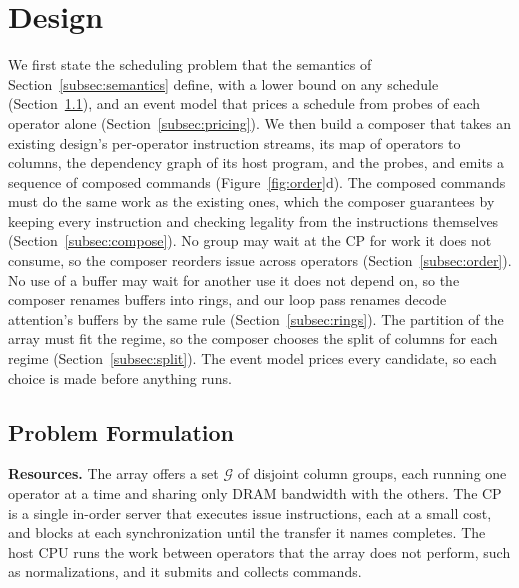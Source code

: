 \section{Design}
\label{sec:method}

We first state the scheduling problem that the semantics of Section~\ref{subsec:semantics} define, with a lower bound on any schedule (Section~\ref{subsec:formulation}), and an event model that prices a schedule from probes of each operator alone (Section~\ref{subsec:pricing}).
We then build a composer that takes an existing design's per-operator instruction streams, its map of operators to columns, the dependency graph of its host program, and the probes, and emits a sequence of composed commands (Figure~\ref{fig:order}d).
The composed commands must do the same work as the existing ones, which the composer guarantees by keeping every instruction and checking legality from the instructions themselves (Section~\ref{subsec:compose}).
No group may wait at the CP for work it does not consume, so the composer reorders issue across operators (Section~\ref{subsec:order}).
No use of a buffer may wait for another use it does not depend on, so the composer renames buffers into rings, and our loop pass renames decode attention's buffers by the same rule (Section~\ref{subsec:rings}).
The partition of the array must fit the regime, so the composer chooses the split of columns for each regime (Section~\ref{subsec:split}).
The event model prices every candidate, so each choice is made before anything runs.

\subsection{Problem Formulation}
\label{subsec:formulation}

\textbf{Resources.}
The array offers a set $\mathcal{G}$ of disjoint column groups, each running one operator at a time and sharing only DRAM bandwidth with the others.
The CP is a single in-order server that executes issue instructions, each at a small cost, and blocks at each synchronization until the transfer it names completes.
The host CPU runs the work between operators that the array does not perform, such as normalizations, and it submits and collects commands.

